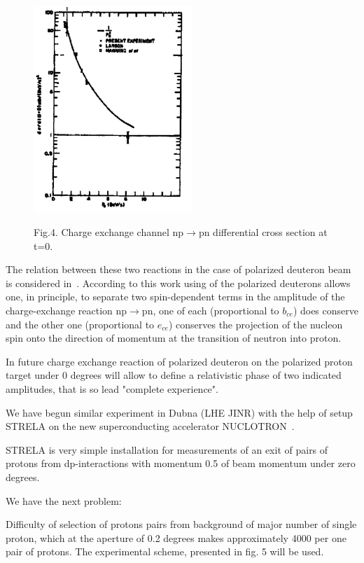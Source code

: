\documentclass[a4paper,12pt]{article}
\begin{document}
\begin{figure}[hbt]
  \begin{center}
    \includegraphics[width=6cm]{fig4.pdf}
  \end{center}
  \vspace{0,4mm}
  \noindent
  Fig.4. Charge exchange channel np$\to$pn
  differential cross section at t=0.\\
\end{figure}

The relation between these two reactions in the case of polarized deuteron beam
is considered in~\cite {a8}. According to this work using of the polarized
deuterons allows one, in principle, to separate two spin-dependent terms in the
amplitude of the charge-exchange reaction np$\to$pn, one of each (proportional
to $b_{ce}$) does conserve and the other one (proportional to $e_{ce}$)
conserves the projection of the nucleon spin onto the direction of momentum at
the transition of neutron into proton.

In future charge exchange reaction of polarized deuteron on the polarized proton
target under 0 degrees will allow to define a relativistic phase of two
indicated amplitudes, that is so lead "complete experience".

We have begun similar experiment in Dubna (LHE JINR) with the help of setup
STRELA on the new superconducting accelerator NUCLOTRON~\cite {a9}.

STRELA is very simple installation for measurements of an exit of pairs of
protons from dp-interactions with momentum 0.5 of beam momentum under zero
degrees.

We have the next problem:

Difficulty of selection of protons pairs from background of major number of
single proton, which at the aperture of 0.2 degrees makes approximately 4000 per
one pair of protons. The experimental scheme, presented in fig. 5 will be used.
\end{document}
